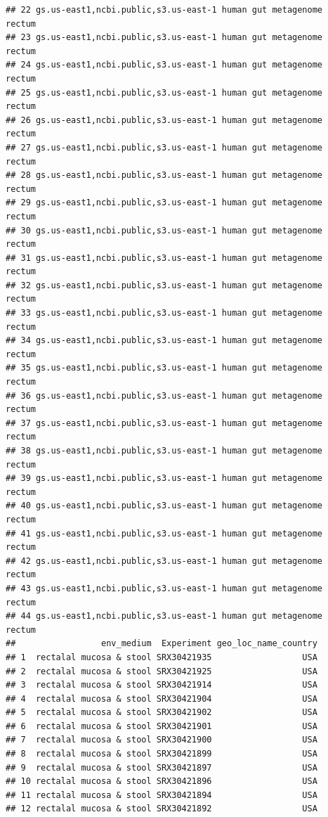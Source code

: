 \documentclass[
]{article}
\begin{document}
\begin{verbatim}
## 22 gs.us-east1,ncbi.public,s3.us-east-1 human gut metagenome          rectum
## 23 gs.us-east1,ncbi.public,s3.us-east-1 human gut metagenome          rectum
## 24 gs.us-east1,ncbi.public,s3.us-east-1 human gut metagenome          rectum
## 25 gs.us-east1,ncbi.public,s3.us-east-1 human gut metagenome          rectum
## 26 gs.us-east1,ncbi.public,s3.us-east-1 human gut metagenome          rectum
## 27 gs.us-east1,ncbi.public,s3.us-east-1 human gut metagenome          rectum
## 28 gs.us-east1,ncbi.public,s3.us-east-1 human gut metagenome          rectum
## 29 gs.us-east1,ncbi.public,s3.us-east-1 human gut metagenome          rectum
## 30 gs.us-east1,ncbi.public,s3.us-east-1 human gut metagenome          rectum
## 31 gs.us-east1,ncbi.public,s3.us-east-1 human gut metagenome          rectum
## 32 gs.us-east1,ncbi.public,s3.us-east-1 human gut metagenome          rectum
## 33 gs.us-east1,ncbi.public,s3.us-east-1 human gut metagenome          rectum
## 34 gs.us-east1,ncbi.public,s3.us-east-1 human gut metagenome          rectum
## 35 gs.us-east1,ncbi.public,s3.us-east-1 human gut metagenome          rectum
## 36 gs.us-east1,ncbi.public,s3.us-east-1 human gut metagenome          rectum
## 37 gs.us-east1,ncbi.public,s3.us-east-1 human gut metagenome          rectum
## 38 gs.us-east1,ncbi.public,s3.us-east-1 human gut metagenome          rectum
## 39 gs.us-east1,ncbi.public,s3.us-east-1 human gut metagenome          rectum
## 40 gs.us-east1,ncbi.public,s3.us-east-1 human gut metagenome          rectum
## 41 gs.us-east1,ncbi.public,s3.us-east-1 human gut metagenome          rectum
## 42 gs.us-east1,ncbi.public,s3.us-east-1 human gut metagenome          rectum
## 43 gs.us-east1,ncbi.public,s3.us-east-1 human gut metagenome          rectum
## 44 gs.us-east1,ncbi.public,s3.us-east-1 human gut metagenome          rectum
##                 env_medium  Experiment geo_loc_name_country
## 1  rectalal mucosa & stool SRX30421935                  USA
## 2  rectalal mucosa & stool SRX30421925                  USA
## 3  rectalal mucosa & stool SRX30421914                  USA
## 4  rectalal mucosa & stool SRX30421904                  USA
## 5  rectalal mucosa & stool SRX30421902                  USA
## 6  rectalal mucosa & stool SRX30421901                  USA
## 7  rectalal mucosa & stool SRX30421900                  USA
## 8  rectalal mucosa & stool SRX30421899                  USA
## 9  rectalal mucosa & stool SRX30421897                  USA
## 10 rectalal mucosa & stool SRX30421896                  USA
## 11 rectalal mucosa & stool SRX30421894                  USA
## 12 rectalal mucosa & stool SRX30421892                  USA

\end{verbatim}
\end{document}
